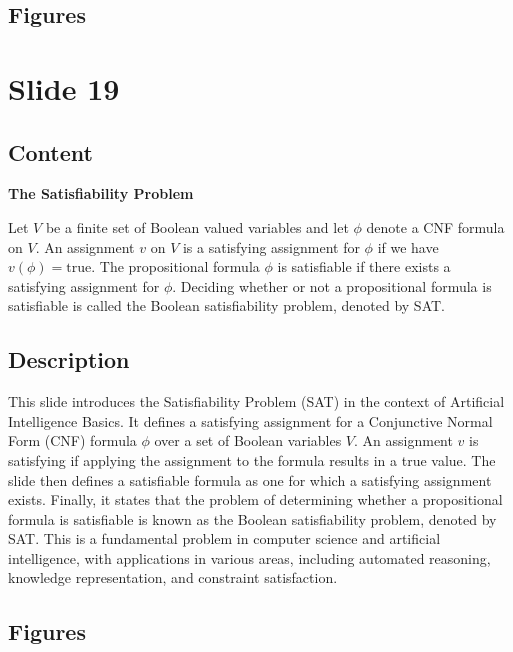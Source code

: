 \documentclass{article}%
\begin{document}
\subsection{Figures}%
\begin{figure}[H]%
\centering%
\end{figure}

%
\newpage%
\section{Slide 19}%
\label{sec:Slide19}%
\subsection{Content}%

\textbf{The Satisfiability Problem}

Let $V$ be a finite set of Boolean valued variables and let $\phi$ denote a CNF formula on $V$.
An assignment $v$ on $V$ is a satisfying assignment for $\phi$ if we have $v(\phi) = \text{true}$.
The propositional formula $\phi$ is satisfiable if there exists a satisfying assignment for $\phi$.
Deciding whether or not a propositional formula is satisfiable is called the Boolean satisfiability problem, denoted by SAT.
%
\subsection{Description}%
This slide introduces the Satisfiability Problem (SAT) in the context of Artificial Intelligence Basics.  It defines a satisfying assignment for a Conjunctive Normal Form (CNF) formula $\phi$ over a set of Boolean variables $V$.  An assignment $v$ is satisfying if applying the assignment to the formula results in a true value.  The slide then defines a satisfiable formula as one for which a satisfying assignment exists.  Finally, it states that the problem of determining whether a propositional formula is satisfiable is known as the Boolean satisfiability problem, denoted by SAT.  This is a fundamental problem in computer science and artificial intelligence, with applications in various areas, including automated reasoning, knowledge representation, and constraint satisfaction.%
\subsection{Figures}%
\begin{figure}[H]%
\centering%
\end{figure}
\end{document}
